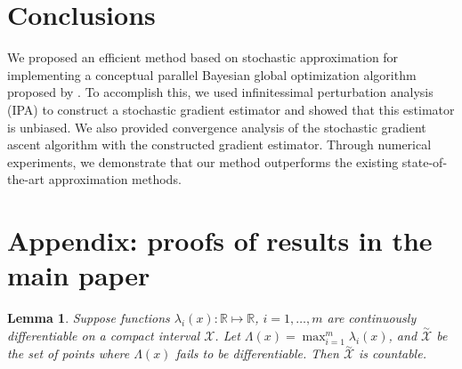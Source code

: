 \documentclass[paper=letter]{scrartcl}
\newtheorem{lemma}{Lemma}
\begin{document}


\section{Conclusions}
We proposed an efficient method based on stochastic approximation for implementing a conceptual parallel Bayesian global optimization algorithm proposed by \cite{GiLeCa08}. To accomplish this, we used infinitessimal perturbation analysis (IPA) to construct a stochastic gradient estimator and showed that this estimator is unbiased. We also provided convergence analysis of the stochastic gradient
ascent algorithm with the constructed gradient estimator. Through numerical experiments, we demonstrate that our method outperforms the existing state-of-the-art approximation methods.




\section*{Appendix: proofs of results in the main paper}
\begin{lemma}
\label{lemma:1}
Suppose functions $\lambda_i(x) : \mathbb{R} \mapsto \mathbb{R}$, $i=1,\ldots,m$ are continuously differentiable on a compact interval $\mathcal{X}$. 
Let $\Lambda(x) = \max_{i=1}^m \lambda_i(x)$, and $\overset{\sim}{\mathcal{X}}$ be the set of points where $\Lambda(x)$ fails to be differentiable. 
Then $\overset{\sim}{\mathcal{X}}$ is countable.
\end{lemma}
\end{document}
